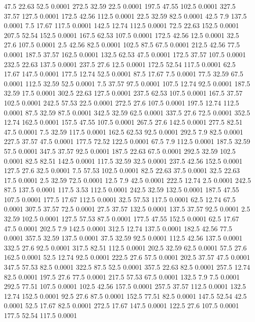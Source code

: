 47.5	22.63	52.5	0.0001
272.5	32.59	22.5	0.0001
197.5	47.55	102.5	0.0001
327.5	37.57	127.5	0.0001
172.5	42.56	112.5	0.0001
22.5	32.59	82.5	0.0001
42.5	7.9	137.5	0.0001
7.5	17.67	117.5	0.0001
142.5	12.74	112.5	0.0001
72.5	22.63	152.5	0.0001
207.5	52.54	152.5	0.0001
167.5	62.53	107.5	0.0001
172.5	42.56	12.5	0.0001
32.5	27.6	107.5	0.0001
2.5	42.56	82.5	0.0001
102.5	87.5	67.5	0.0001
212.5	42.56	77.5	0.0001
187.5	37.57	162.5	0.0001
132.5	62.53	47.5	0.0001
172.5	37.57	107.5	0.0001
232.5	22.63	137.5	0.0001
237.5	27.6	12.5	0.0001
172.5	52.54	117.5	0.0001
62.5	17.67	147.5	0.0001
177.5	12.74	52.5	0.0001
87.5	17.67	7.5	0.0001
77.5	32.59	67.5	0.0001
112.5	32.59	52.5	0.0001
7.5	37.57	97.5	0.0001
107.5	12.74	92.5	0.0001
187.5	32.59	17.5	0.0001
302.5	22.63	127.5	0.0001
237.5	62.53	107.5	0.0001
167.5	37.57	102.5	0.0001
242.5	57.53	22.5	0.0001
272.5	27.6	107.5	0.0001
197.5	12.74	112.5	0.0001
87.5	32.59	87.5	0.0001
342.5	32.59	62.5	0.0001
337.5	27.6	72.5	0.0001
352.5	12.74	162.5	0.0001
157.5	47.55	107.5	0.0001
267.5	27.6	142.5	0.0001
277.5	82.51	47.5	0.0001
7.5	32.59	117.5	0.0001
162.5	62.53	92.5	0.0001
292.5	7.9	82.5	0.0001
227.5	37.57	47.5	0.0001
177.5	72.52	122.5	0.0001
67.5	7.9	112.5	0.0001
187.5	32.59	57.5	0.0001
347.5	37.57	92.5	0.0001
187.5	22.63	67.5	0.0001
292.5	32.59	102.5	0.0001
82.5	82.51	142.5	0.0001
117.5	32.59	32.5	0.0001
237.5	42.56	152.5	0.0001
127.5	27.6	32.5	0.0001
7.5	57.53	102.5	0.0001
82.5	22.63	37.5	0.0001
32.5	22.63	17.5	0.0001
2.5	32.59	72.5	0.0001
12.5	7.9	42.5	0.0001
222.5	12.74	2.5	0.0001
242.5	87.5	137.5	0.0001
117.5	3.53	112.5	0.0001
242.5	32.59	132.5	0.0001
187.5	47.55	107.5	0.0001
177.5	17.67	112.5	0.0001
32.5	57.53	117.5	0.0001
62.5	12.74	67.5	0.0001
307.5	37.57	72.5	0.0001
27.5	37.57	132.5	0.0001
137.5	37.57	92.5	0.0001
2.5	32.59	102.5	0.0001
127.5	57.53	87.5	0.0001
177.5	47.55	152.5	0.0001
62.5	17.67	47.5	0.0001
202.5	7.9	142.5	0.0001
312.5	12.74	137.5	0.0001
182.5	42.56	77.5	0.0001
357.5	32.59	137.5	0.0001
37.5	32.59	92.5	0.0001
112.5	42.56	137.5	0.0001
332.5	27.6	92.5	0.0001
317.5	82.51	112.5	0.0001
202.5	32.59	62.5	0.0001
57.5	27.6	162.5	0.0001
52.5	12.74	92.5	0.0001
222.5	27.6	57.5	0.0001
202.5	37.57	47.5	0.0001
347.5	57.53	82.5	0.0001
322.5	87.5	52.5	0.0001
357.5	22.63	82.5	0.0001
257.5	12.74	82.5	0.0001
197.5	27.6	77.5	0.0001
217.5	57.53	67.5	0.0001
132.5	7.9	7.5	0.0001
292.5	77.51	107.5	0.0001
102.5	42.56	157.5	0.0001
257.5	37.57	112.5	0.0001
132.5	12.74	152.5	0.0001
92.5	27.6	87.5	0.0001
152.5	77.51	82.5	0.0001
147.5	52.54	42.5	0.0001
52.5	17.67	82.5	0.0001
272.5	17.67	147.5	0.0001
122.5	27.6	107.5	0.0001
177.5	52.54	117.5	0.0001
